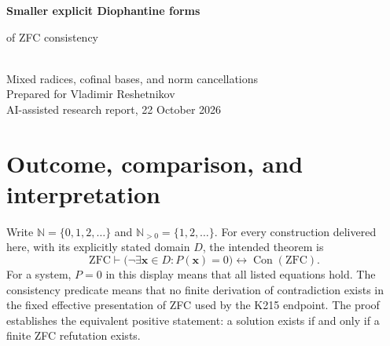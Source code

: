\documentclass[11pt]{article}
\theoremstyle{definition}\newtheorem{definition}[theorem]{Definition}
\theoremstyle{remark}\newtheorem{remark}[theorem]{Remark}
\newcommand{\N}{\mathbb N}\newcommand{\Z}{\mathbb Z}\newcommand{\Q}{\mathbb Q}
\newcommand{\ZFC}{\mathrm{ZFC}}\newcommand{\Con}{\operatorname{Con}}
\begin{document}
\begin{center}
{\LARGE\bfseries Smaller explicit Diophantine forms\par of ZFC consistency}\\[0.7em]
{\large Mixed radices, cofinal bases, and norm cancellations}\\[1em]
Prepared for Vladimir Reshetnikov\\[0.2em]
AI-assisted research report, 22 October 2026
\end{center}
\begin{abstract}
We compare the seven current ProveIt constructions, numbered 24--30,
and combine features that their separate presentations leave uncombined.
The main new variable reduction gives one explicitly specified polynomial
in sixteen unrestricted integers. Its degree is
$813056\cdot5^{32}+10024$, and its delivered arithmetic circuit uses
1865 binary operations. A seventeen-integer alternative has degree
$406528\cdot5^{32}+27512$ and 1874 operations. A cofinal family of square
radices removes one positivity witness; a smaller signed separating weight
also lowers the degree. For positive unknowns we obtain a twelve-variable
equation of degree 1065, and separately reduce the 1081-degree equation
from 111 to 108 operations. Three coordinate shifts give a 31-variable
quadratic system using 62 operations, or a quartic equation using 127.
All families can use a new, fully materialized four-coefficient tuple with
$B=2^{1064921}$, a substantial reduction from $2^{1953125}$.
We give ordinary mathematical proofs, literal arithmetic circuits,
coefficient generators, and independent finite audits. The equivalences
are formalizable in ZFC; the new reductions are not claimed to be new
end-to-end Lean or Rocq certificates, globally minimal presentations,
or proofs of ZFC consistency.
\end{abstract}
\newpage
\tableofcontents
\newpage

\section{Outcome, comparison, and interpretation}
\label{sec:outcome}

Write $\N=\{0,1,2,\ldots\}$ and $\N_{>0}=\{1,2,\ldots\}$.
For every construction delivered here, with its explicitly stated domain
$D$, the intended theorem is
\begin{equation}\label{eq:main-theorem}
 \ZFC\vdash
 \bigl(\neg\exists\boldsymbol{x}\in D:
           P(\boldsymbol{x})=0\bigr)
 \longleftrightarrow\Con(\ZFC).
\end{equation}
For a system, $P=0$ in this display means that all listed equations hold.
The consistency predicate means that no finite derivation of contradiction
exists in the fixed effective presentation of ZFC used by the K215 endpoint.
The proof establishes the equivalent positive statement: a solution exists
if and only if a finite ZFC refutation exists.
\end{document}

